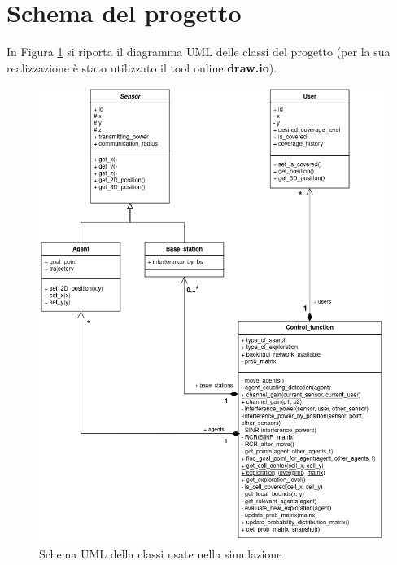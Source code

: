 \section{Schema del progetto} \label{sec:schema_classi}

In Figura \ref{fig:uml_scheme} si riporta il diagramma UML delle classi del progetto (per la sua realizzazione è stato utilizzato il tool online 
\textbf{draw.io}).

\begin{figure}[p]
    \centering
    \includegraphics[width=1\textwidth]{img/ch3/UML_thesis.png}
    \caption[Schema UML]{Schema UML della classi usate nella simulazione}
    \label{fig:uml_scheme}
\end{figure}

